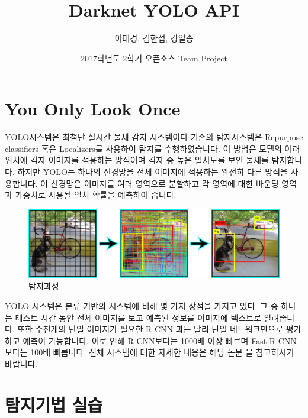 \documentclass{article}
\title{Darknet YOLO API}
\author{이대경, 김한섭, 강일송 }
\date{2017학년도 2학기 오픈소스 Team Project}
\begin{document}
\maketitle


\newpage %

\tableofcontents %

\newpage

\section{You Only Look Once}

\indent YOLO시스템은 최첨단 실시간 물체 감지 시스템이다
기존의 탐지시스템은 Repurpose classifiers 혹은 Localizers를 사용하여 탐지를 수행하였습니다. 이 방법은 모델의 여러 위치에 격자 이미지를 적용하는 방식이며 격자 중 높은 일치도를 보인 물체를 탐지합니다. 하지만 YOLO는 하나의 신경망을 전체 이미지에 적용하는 완전히 다른 방식을 사용합니다. 이 신경망은 이미지를 여러 영역으로 분할하고 각 영역에 대한 바운딩 영역과 가중치로 사용될 일치 확률을 예측하여 줍니다.

\begin{figure}[h!]
\centering
\includegraphics[scale=0.2]{model2.png}
\caption{탐지과정}
\label{fig:detect}
\end{figure}

YOLO 시스템은 분류 기반의 시스템에 비해 몇 가지 장점을 가지고 있다.
그 중 하나는 테스트 시간 동안 전체 이미지를 보고 예측된 정보를 이미지에 텍스트로 알려줍니다. 또한 수천개의 단일 이미지가 필요한 R-CNN 과는 달리 단일 네트워크만으로 평가하고 예측이 가능합니다. 이로 인해 R-CNN보다는 1000배 이상 빠르며 Fast R-CNN보다는 100배 빠릅니다. 전체 시스템에 대한 자세한 내용은 해당 논문\citep{YOLO9000} 을 참고하시기 바랍니다.


\section{탐지기법 실습}
\end{document}
